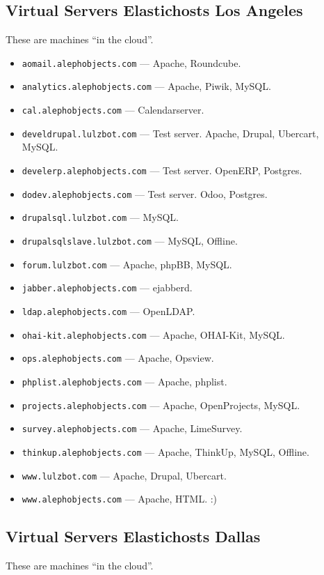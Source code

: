\subsection{Virtual Servers Elastichosts Los Angeles}
These are machines ``in the cloud''.

\begin{itemize}
\item \texttt{aomail.alephobjects.com} --- Apache, Roundcube.
\item \texttt{analytics.alephobjects.com}  --- Apache, Piwik, MySQL.
\item \texttt{cal.alephobjects.com} --- Calendarserver.
\item \texttt{develdrupal.lulzbot.com} --- Test server. Apache, Drupal,
       Ubercart, MySQL.
\item \texttt{develerp.alephobjects.com} --- Test server. OpenERP, Postgres.
\item \texttt{dodev.alephobjects.com} --- Test server. Odoo, Postgres.
\item \texttt{drupalsql.lulzbot.com} --- MySQL.
\item \texttt{drupalsqlslave.lulzbot.com} --- MySQL, Offline.
\item \texttt{forum.lulzbot.com} --- Apache, phpBB, MySQL.
\item \texttt{jabber.alephobjects.com} --- ejabberd.
\item \texttt{ldap.alephobjects.com} --- OpenLDAP.
\item \texttt{ohai-kit.alephobjects.com} --- Apache, OHAI-Kit, MySQL.
\item \texttt{ops.alephobjects.com} --- Apache, Opsview.
\item \texttt{phplist.alephobjects.com} --- Apache, phplist.
\item \texttt{projects.alephobjects.com} --- Apache, OpenProjects, MySQL.
\item \texttt{survey.alephobjects.com} --- Apache, LimeSurvey.
\item \texttt{thinkup.alephobjects.com} --- Apache, ThinkUp, MySQL, Offline.
\item \texttt{www.lulzbot.com} --- Apache, Drupal, Ubercart.
\item \texttt{www.alephobjects.com} --- Apache, HTML.  :)
\end{itemize}

\subsection{Virtual Servers Elastichosts Dallas}
These are machines ``in the cloud''.

